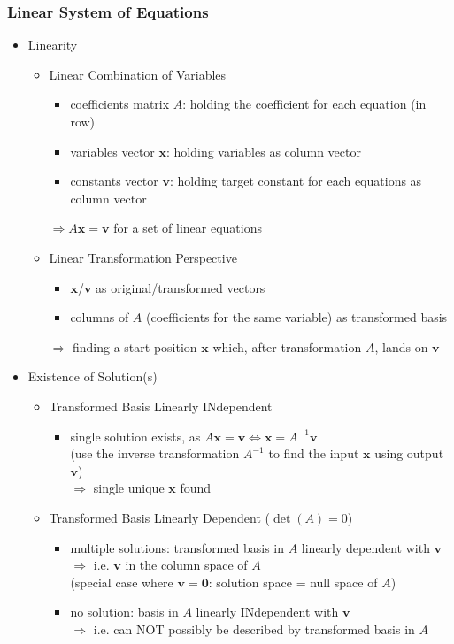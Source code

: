\subsubsection{Linear System of Equations}
\begin{itemize}
\item Linearity
	\begin{itemize}
	\item Linear Combination of Variables
		\begin{itemize}
		\item coefficients matrix $A$: holding the coefficient for each equation (in row)
		\item variables vector $\mathbf x$: holding variables as column vector
		\item constants vector $\mathbf v$: holding target constant for each equations as column vector
		\end{itemize}
		$\Rightarrow A\mathbf x = \mathbf v$ for a set of linear equations
	\item Linear Transformation Perspective
		\begin{itemize}
		\item $\mathbf x$/$\mathbf v$ as original/transformed vectors
		\item columns of $A$ (coefficients for the same variable) as transformed basis
		\end{itemize}
		$\Rightarrow$ finding a start position $\mathbf x$ which, after transformation $A$, lands on $\mathbf v$		
	\end{itemize}

\item Existence of Solution(s)
	\begin{itemize}
	\item Transformed Basis Linearly INdependent
		\begin{itemize}
		\item single solution exists, as $A\mathbf x=\mathbf v \Leftrightarrow \mathbf x = A^{-1}\mathbf v$ \\
		(use the inverse transformation $A^{-1}$ to find the input $\mathbf x$ using output $\mathbf v$) \\
		$\Rightarrow$ single unique $\mathbf x$ found
		\end{itemize}
	\item Transformed Basis Linearly Dependent ($\det(A) = 0$)
		\begin{itemize}
		\item multiple solutions: transformed basis in $A$ linearly dependent with $\mathbf v$ \\
		$\Rightarrow$ i.e. $\mathbf v$ in the column space of $A$ \\
		(special case where $\mathbf v=\mathbf 0$: solution space = null space of $A$)
		\item no solution: basis in $A$ linearly INdependent with $\mathbf v$ \\
		$\Rightarrow$ i.e. can NOT possibly be described by transformed basis in $A$
		\end{itemize}
	\end{itemize}


\end{itemize}
